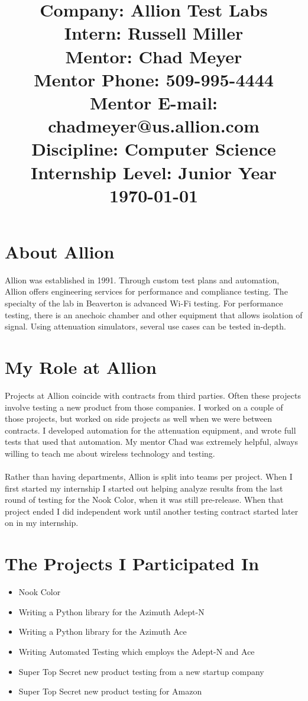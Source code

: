 \documentclass{article}
\title{Company: Allion Test Labs\\
Intern: Russell Miller\\
Mentor: Chad Meyer\\
Mentor Phone: 509-995-4444\\
Mentor E-mail: chadmeyer@us.allion.com\\
Discipline: Computer Science\\
Internship Level: Junior Year\\
\today}
\date{}
\begin{document}
\maketitle

\pagebreak

\section*{About Allion}
Allion was established in 1991. Through custom test plans and automation, Allion
offers engineering services for performance and compliance testing. 
The specialty of the lab in Beaverton is advanced Wi-Fi testing. For performance
testing, there is an anechoic chamber and other equipment that allows isolation
of signal. Using attenuation simulators, several use cases can be tested 
in-depth.

\section*{My Role at Allion}
Projects at Allion coincide with contracts from third parties. Often these
projects involve testing a new product from those companies. I worked on a
couple of those projects, but worked on side projects as well when we were
between contracts. I developed automation for the attenuation equipment, and
wrote full tests that used that automation. My mentor Chad was extremely 
helpful, always willing to teach me about wireless technology and testing.\\
\\
Rather than having departments, Allion is split into teams per project. When I
first started my internship I started out helping analyze results from the last 
round of testing for the Nook Color, when it was still pre-release. When that
project ended I did independent work until another testing contract started
later on in my internship.

\section*{The Projects I Participated In}
\begin{itemize}
\item Nook Color
\item Writing a Python library for the Azimuth Adept-N
\item Writing a Python library for the Azimuth Ace
\item Writing Automated Testing which employs the Adept-N and Ace
\item Super Top Secret new product testing from a new startup company
\item Super Top Secret new product testing for Amazon
\end{itemize}
\end{document}
